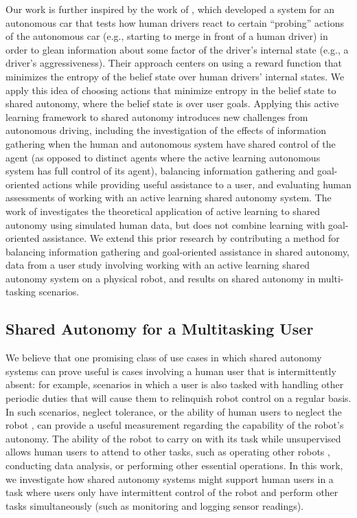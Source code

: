 \documentclass[conference]{IEEEtran}
\begin{document}
Our work is further inspired by the work of \citet{sadigh2016information}, which developed a system for an autonomous car that tests how human drivers react to certain ``probing'' actions of the autonomous car (e.g., starting to merge in front of a human driver) in order to glean information about some factor of the driver's internal state (e.g., a driver's aggressiveness). Their approach centers on using a reward function that minimizes the entropy of the belief state over human drivers' internal states. We apply this idea of choosing actions that minimize entropy in the belief state to shared autonomy, where the belief state is over user goals. Applying this active learning framework to shared autonomy introduces new challenges from autonomous driving, including the investigation of the effects of information gathering when the human and autonomous system have shared control of the agent (as opposed to distinct agents where the active learning autonomous system has full control of its agent), balancing information gathering and goal-oriented actions while providing useful assistance to a user, and evaluating human assessments of working with an active learning shared autonomy system. The work of \citet{landolfi2017exploring} investigates the theoretical application of active learning to shared autonomy using simulated human data, but does not combine learning with goal-oriented assistance. We extend this prior research by contributing a method for balancing information gathering and goal-oriented assistance in shared autonomy, data from a user study involving working with an active learning shared autonomy system on a physical robot, and results on shared autonomy in multi-tasking scenarios.

\subsection{Shared Autonomy for a Multitasking User}
We believe that one promising class of use cases in which shared autonomy systems can prove useful is cases involving a human user that is intermittently absent: for example, scenarios in which a user is also tasked with handling other periodic duties that will cause them to relinquish robot control on a regular basis. In such scenarios, neglect tolerance, or the ability of human users to neglect the robot \cite{crandall2002characterizing, olsen2003metrics}, can provide a useful measurement regarding the capability of the robot's autonomy. The ability of the robot to carry on with its task while unsupervised allows human users to attend to other tasks, such as operating other robots \cite{crandall2005validating, cummings2008predicting}, conducting data analysis, or performing other essential operations. In this work, we investigate how shared autonomy systems might support human users in a task where users only have intermittent control of the robot and perform other tasks simultaneously (such as monitoring and logging sensor readings).
\end{document}
